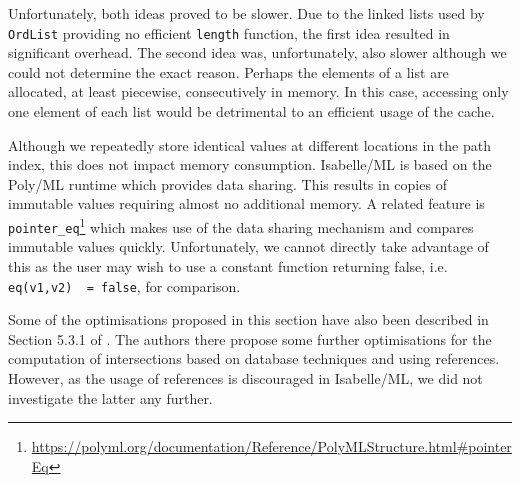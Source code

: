 Unfortunately, both ideas proved to be slower. Due to the linked lists used by \lstinline{OrdList} providing no efficient \lstinline{length} function, the first idea resulted in significant overhead. The second idea was, unfortunately, also slower although we could not determine the exact reason. Perhaps the elements of a list are allocated, at least piecewise, consecutively in memory. In this case, accessing only one element of each list would be detrimental to an efficient usage of the cache.

Although we repeatedly store identical values at different locations in the path index, this does not impact memory consumption. Isabelle/ML is based on the Poly/ML runtime \cite{noauthor_polyml_nodate} which provides data sharing. This results in copies of immutable values requiring almost no additional memory. A related feature is \lstinline{pointer_eq}\footnote{\url{https://polyml.org/documentation/Reference/PolyMLStructure.html\#pointerEq}} which makes use of the data sharing mechanism and compares immutable values quickly. Unfortunately, we cannot directly take advantage of this as the user may wish to use a constant function returning false, i.e. \lstinline{eq(v1,v2)  = false}, for comparison.

Some of the optimisations proposed in this section have also been described in Section 5.3.1 of \cite{twain_set-based_1995}.
The authors there propose some further optimisations for the computation of intersections based on database techniques and using references.
However, as the usage of references is discouraged in Isabelle/ML, we did not investigate the latter any further.
